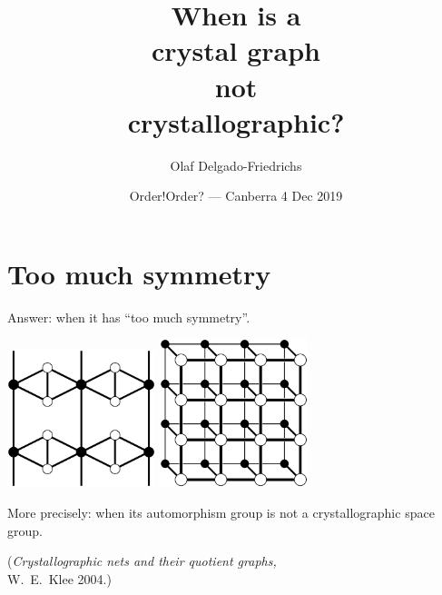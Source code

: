 \documentclass{beamer}
\title{When is a\\ crystal graph\\ not\\ crystallographic?}
\author[Olaf Delgado]{Olaf Delgado-Friedrichs}
\date{Order!Order? --- Canberra 4 Dec 2019}
\begin{document}
\begin{frame}
  \titlepage
\end{frame}

\section{Too much symmetry}

\begin{frame}
  \begin{center}
    Answer: when it has ``too much symmetry''.

    \includegraphics[width=1.7in]{unstable}
    \qquad
    \includegraphics[width=1.7in]{ladder}

    More precisely: when its automorphism group is not a crystallographic
    space group.

    ({\em Crystallographic nets and their quotient graphs,}\\
    W.\ E.\ Klee 2004.)
  \end{center}
\end{frame}
\end{document}

